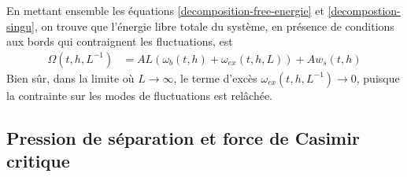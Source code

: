 En mettant ensemble les équations \ref{decomposition-free-energie} et \ref{decompostion-singu}, on trouve que l'énergie libre totale du système, en présence de conditions aux bords qui contraignent les fluctuations, est
\begin{align}
    \Omega(t,h,L^{-1}) &= A L \left( \omega_b(t,h) +  \omega_{ex}(t,h,L) \right) + A w_s(t,h) 
    \label{full-decomposition}
\end{align}
Bien sûr, dans la limite où $L\to \infty$, le terme d'excès $\omega_{ex}(t,h,L^{-1}) \to 0$, puisque la contrainte sur les modes de fluctuations est relâchée. 

    \subsection{Pression de séparation et force de Casimir critique}

